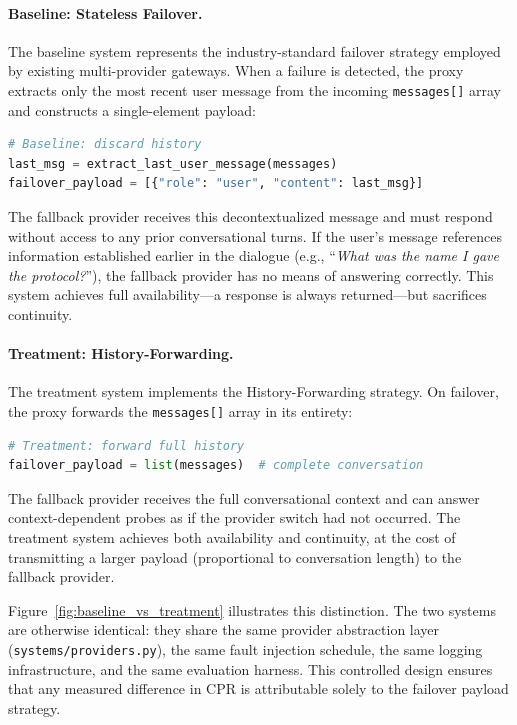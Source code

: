 \paragraph{Baseline: Stateless Failover.}
The baseline system represents the industry-standard failover strategy employed by existing multi-provider gateways. When a failure is detected, the proxy extracts only the most recent user message from the incoming \texttt{messages[]} array and constructs a single-element payload:

\begin{lstlisting}[language=Python, basicstyle=\small\ttfamily, frame=single, numbers=none]
# Baseline: discard history
last_msg = extract_last_user_message(messages)
failover_payload = [{"role": "user", "content": last_msg}]
\end{lstlisting}

The fallback provider receives this decontextualized message and must respond without access to any prior conversational turns. If the user's message references information established earlier in the dialogue (e.g., ``\textit{What was the name I gave the protocol?}''), the fallback provider has no means of answering correctly. This system achieves full availability---a response is always returned---but sacrifices continuity.

\paragraph{Treatment: History-Forwarding.}
The treatment system implements the History-Forwarding strategy. On failover, the proxy forwards the \texttt{messages[]} array in its entirety:

\begin{lstlisting}[language=Python, basicstyle=\small\ttfamily, frame=single, numbers=none]
# Treatment: forward full history
failover_payload = list(messages)  # complete conversation
\end{lstlisting}

The fallback provider receives the full conversational context and can answer context-dependent probes as if the provider switch had not occurred. The treatment system achieves both availability and continuity, at the cost of transmitting a larger payload (proportional to conversation length) to the fallback provider.

Figure~\ref{fig:baseline_vs_treatment} illustrates this distinction. The two systems are otherwise identical: they share the same provider abstraction layer (\texttt{systems/providers.py}), the same fault injection schedule, the same logging infrastructure, and the same evaluation harness. This controlled design ensures that any measured difference in CPR is attributable solely to the failover payload strategy.

